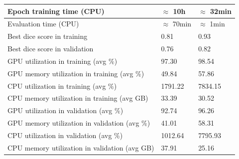 \begin{table}[!htb]
\begin{tabular}{l|l|l|}
\multicolumn{1}{|l|}{Epoch training time (CPU)}                        &                 $\approx$ 10h                     &                                        $\approx$ 32min  \\ \hline
\multicolumn{1}{|l|}{Evaluation time (CPU)}                            &                      $\approx$ 70min                &                                        $\approx$ 1min  \\ \hline
\multicolumn{1}{|l|}{Best dice score in training}                &                   0.81                   &                                      0.93    \\ \hline
\multicolumn{1}{|l|}{Best dice score in validation}              &                   0.76                   &                                      0.82    \\ \hline
\multicolumn{1}{|l|}{GPU utilization in training (avg \%)}          &                   97.30                   &                                     98.54     \\ \hline
\multicolumn{1}{|l|}{GPU memory utilization in training (avg \%)}   &                49.84                      &                                  57.86        \\ \hline
\multicolumn{1}{|l|}{CPU utilization in training (avg \%)}          &             1791.22                         &                             7834.15             \\ \hline
\multicolumn{1}{|l|}{CPU memory utilization in training (avg GB)}   &               33.39                       &                                 30.52         \\ \hline
\multicolumn{1}{|l|}{GPU utilization in validation (avg \%)}        &                92.74                      &                                  96.26        \\ \hline
\multicolumn{1}{|l|}{GPU memory utilization in validation (avg \%)} &                   41.01                   &                                     58.31     \\ \hline
\multicolumn{1}{|l|}{CPU utilization in validation (avg \%)}        &                   1012.64                   &                                   7795.93       \\ \hline
\multicolumn{1}{|l|}{CPU memory utilization in validation (avg GB)} &                   37.91                   &                                     25.16     \\ \hline
\end{tabular}
\end{table}

